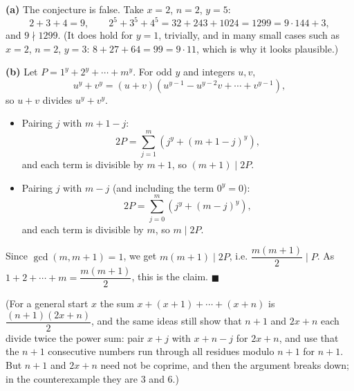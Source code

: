 \textbf{(a)} The conjecture is false. Take $x=2$, $n=2$, $y=5$:
\[2+3+4=9,\qquad2^5+3^5+4^5=32+243+1024=1299=9\cdot144+3,\]
and $9\nmid1299$. (It does hold for $y=1$, trivially, and in many small cases such as $x=2$, $n=2$, $y=3$: $8+27+64=99=9\cdot11$, which is why it looks plausible.)

\textbf{(b)} Let $P=1^y+2^y+\cdots+m^y$. For odd $y$ and integers $u,v$,
\[u^y+v^y=(u+v)\left(u^{y-1}-u^{y-2}v+\cdots+v^{y-1}\right),\]
so $u+v$ divides $u^y+v^y$.
\begin{itemize}
\item Pairing $j$ with $m+1-j$:
\[2P=\sum_{j=1}^{m}\left(j^y+(m+1-j)^y\right),\]
and each term is divisible by $m+1$, so $(m+1)\mid2P$.
\item Pairing $j$ with $m-j$ (and including the term $0^y=0$):
\[2P=\sum_{j=0}^{m}\left(j^y+(m-j)^y\right),\]
and each term is divisible by $m$, so $m\mid2P$.
\end{itemize}
Since $\gcd(m,m+1)=1$, we get $m(m+1)\mid2P$, i.e. $\dfrac{m(m+1)}{2}\mid P$. As $1+2+\cdots+m=\dfrac{m(m+1)}{2}$, this is the claim. $\blacksquare$

(For a general start $x$ the sum $x+(x+1)+\cdots+(x+n)$ is $\dfrac{(n+1)(2x+n)}{2}$, and the same ideas still show that $n+1$ and $2x+n$ each divide twice the power sum: pair $x+j$ with $x+n-j$ for $2x+n$, and use that the $n+1$ consecutive numbers run through all residues modulo $n+1$ for $n+1$. But $n+1$ and $2x+n$ need not be coprime, and then the argument breaks down; in the counterexample they are $3$ and $6$.)
